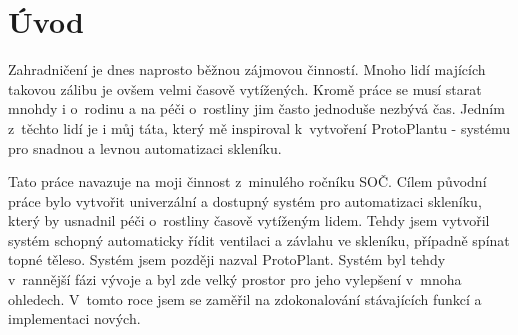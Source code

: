 \chapter*{Úvod}

Zahradničení je dnes naprosto běžnou zájmovou činností. Mnoho lidí majících takovou zálibu je ovšem velmi časově vytížených. Kromě práce se musí starat mnohdy i o~rodinu a na péči o~rostliny jim často jednoduše nezbývá čas. Jedním z~těchto lidí je i můj táta, který mě inspiroval k~vytvoření ProtoPlantu - systému pro snadnou a levnou automatizaci skleníku.

Tato práce navazuje na moji činnost z~minulého ročníku SOČ. Cílem původní práce bylo vytvořit univerzální a dostupný systém pro automatizaci skleníku, který by usnadnil péči o~rostliny časově vytíženým lidem. Tehdy jsem vytvořil systém schopný automaticky řídit ventilaci a závlahu ve skleníku, případně spínat topné těleso. Systém jsem později nazval ProtoPlant.
Systém byl tehdy v~rannější fázi vývoje a byl zde velký prostor pro jeho vylepšení v~mnoha ohledech. V~tomto roce jsem se zaměřil na zdokonalování stávajících funkcí a implementaci nových.

\newpage
